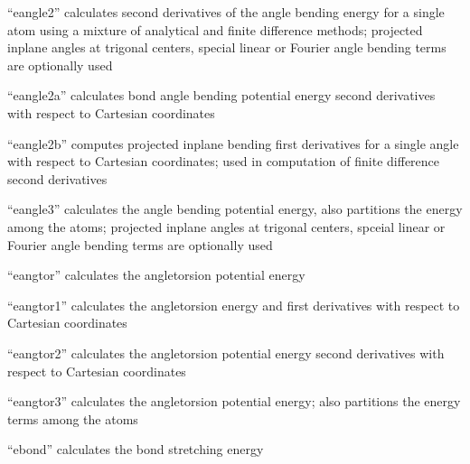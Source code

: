 \documentclass[letterpaper,11pt,english]{sphinxmanual}
\begin{document}
\sphinxAtStartPar
“eangle2” calculates second derivatives of the angle bending energy for a single atom using a mixture of analytical and finite difference methods; projected in\sphinxhyphen{}plane angles at trigonal centers, special linear or Fourier angle bending terms are optionally used

\sphinxAtStartPar
{}

\sphinxAtStartPar
“eangle2a” calculates bond angle bending potential energy second derivatives with respect to Cartesian coordinates

\sphinxAtStartPar
{}

\sphinxAtStartPar
“eangle2b” computes projected in\sphinxhyphen{}plane bending first derivatives for a single angle with respect to Cartesian coordinates; used in computation of finite difference second derivatives

\sphinxAtStartPar
{}

\sphinxAtStartPar
“eangle3” calculates the angle bending potential energy, also partitions the energy among the atoms; projected in\sphinxhyphen{}plane angles at trigonal centers, spceial linear or Fourier angle bending terms are optionally used

\sphinxAtStartPar
{}

\sphinxAtStartPar
“eangtor” calculates the angle\sphinxhyphen{}torsion potential energy

\sphinxAtStartPar
{}

\sphinxAtStartPar
“eangtor1” calculates the angle\sphinxhyphen{}torsion energy and first derivatives with respect to Cartesian coordinates

\sphinxAtStartPar
{}

\sphinxAtStartPar
“eangtor2” calculates the angle\sphinxhyphen{}torsion potential energy second derivatives with respect to Cartesian coordinates

\sphinxAtStartPar
{}

\sphinxAtStartPar
“eangtor3” calculates the angle\sphinxhyphen{}torsion potential energy; also partitions the energy terms among the atoms

\sphinxAtStartPar
{}

\sphinxAtStartPar
“ebond” calculates the bond stretching energy
\end{document}
